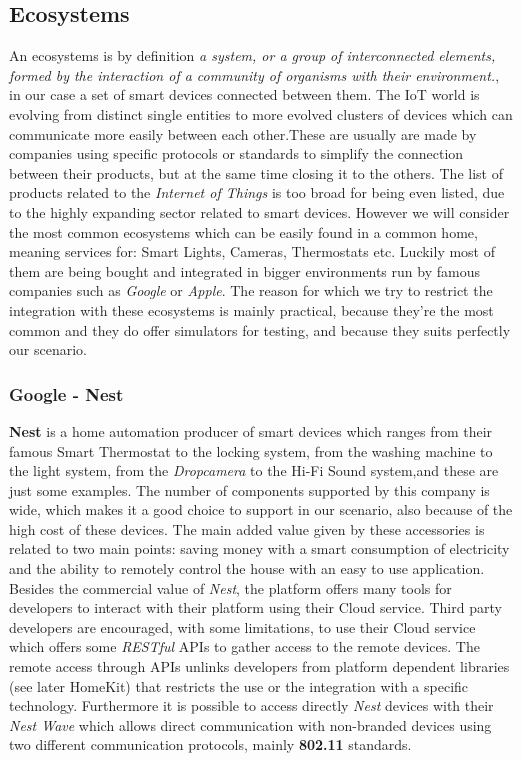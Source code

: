 \begin{itemize}
\subsection{Ecosystems}

An ecosystems is by definition \textit{a system, or a group of interconnected elements,
formed by the interaction of a community of organisms with their environment.},
in our case a set of smart devices connected between them. The IoT world is evolving
from distinct single entities to more evolved clusters of devices which can communicate
more easily between each other.These are usually are made by companies using specific protocols or standards
to simplify the connection between their products, but at the same time closing it to the others.
The list of products related to the \textit{Internet of Things} is too broad for
being even listed, due to the highly expanding sector related to smart devices.
However we will consider the most common ecosystems which can be easily found in a common
home, meaning services for: Smart Lights, Cameras, Thermostats etc. Luckily
most of them are being bought and integrated in bigger environments run by
famous companies such as \textit{Google} or \textit{Apple}.
The reason for which we try to restrict the integration with these ecosystems is
mainly practical, because they're the most common and they do offer simulators
for testing, and because they suits perfectly our scenario.

\subsubsection{Google - Nest}

\textbf{Nest} is a home automation producer of smart devices
which ranges from their famous Smart Thermostat to the locking system, from the
washing machine to the light system, from the \textit{Dropcamera} to the Hi-Fi Sound system,and
these are just some examples. The number of components supported by this company
is wide, which makes it a good choice to support in our scenario, also because of
the high cost of these devices. The main added value given by these accessories is related
to two main points: saving money with a smart consumption of electricity and the ability
to remotely control the house with an easy to use application.
Besides the commercial value of \textit{Nest}, the platform offers many tools for developers
to interact with their platform using their Cloud service. Third party developers
are encouraged, with some limitations, to use their Cloud service which
offers some \textit{RESTful} APIs to gather access to the remote devices.
The remote access through APIs unlinks developers from platform dependent libraries (see later HomeKit)
that restricts the use or the integration with a specific technology.
Furthermore it is possible to access directly \textit{Nest} devices with their \textit{Nest Wave}
which allows direct communication with non-branded devices using two different communication protocols,
mainly \textbf{802.11} standards.



\end{itemize}
